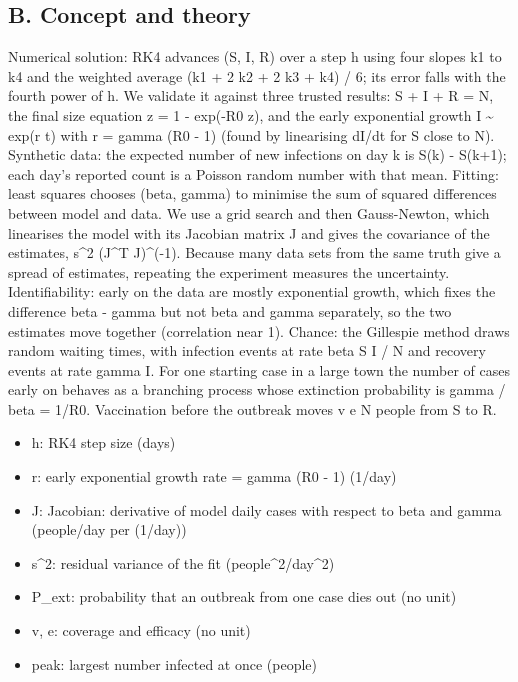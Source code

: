 \documentclass[11pt,a4paper]{article}
\begin{document}
\subsection*{B. Concept and theory}
Numerical solution: RK4 advances (S, I, R) over a step h using four slopes k1 to k4 and the weighted average (k1 + 2 k2 + 2 k3 + k4) / 6; its error falls with the fourth power of h. We validate it against three trusted results: S + I + R = N, the final size equation z = 1 - exp(-R0 z), and the early exponential growth I \textasciitilde{} exp(r t) with r = gamma (R0 - 1) (found by linearising dI/dt for S close to N). Synthetic data: the expected number of new infections on day k is S(k) - S(k+1); each day's reported count is a Poisson random number with that mean. Fitting: least squares chooses (beta, gamma) to minimise the sum of squared differences between model and data. We use a grid search and then Gauss-Newton, which linearises the model with its Jacobian matrix J and gives the covariance of the estimates, s\textasciicircum{}2 (J\textasciicircum{}T J)\textasciicircum{}(-1). Because many data sets from the same truth give a spread of estimates, repeating the experiment measures the uncertainty. Identifiability: early on the data are mostly exponential growth, which fixes the difference beta - gamma but not beta and gamma separately, so the two estimates move together (correlation near 1). Chance: the Gillespie method draws random waiting times, with infection events at rate beta S I / N and recovery events at rate gamma I. For one starting case in a large town the number of cases early on behaves as a branching process whose extinction probability is gamma / beta = 1/R0. Vaccination before the outbreak moves v e N people from S to R.

\begin{itemize}[nosep]
\item h: RK4 step size (days)
\item r: early exponential growth rate = gamma (R0 - 1) (1/day)
\item J: Jacobian: derivative of model daily cases with respect to beta and gamma (people/day per (1/day))
\item s\textasciicircum{}2: residual variance of the fit (people\textasciicircum{}2/day\textasciicircum{}2)
\item P\_ext: probability that an outbreak from one case dies out (no unit)
\item v, e: coverage and efficacy (no unit)
\item peak: largest number infected at once (people)
\end{itemize}
\end{document}
